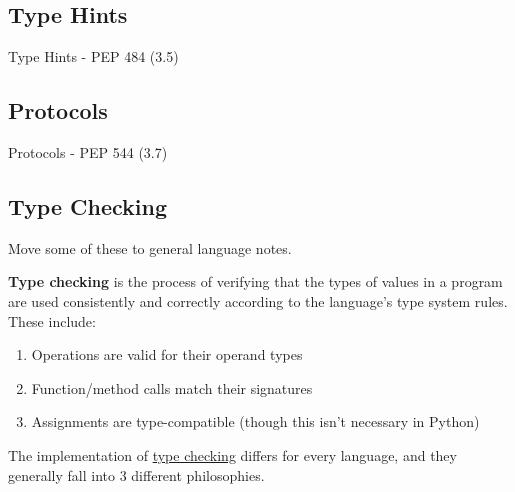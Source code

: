\subsection{Type Hints}

  Type Hints - PEP 484 (3.5) 

\subsection{Protocols}

  Protocols - PEP 544 (3.7) 

\subsection{Type Checking}

  \begin{question}[To Do]
    Move some of these to general language notes. 
  \end{question}

  \begin{definition}
    \label{def:type-checking}
    \textbf{Type checking} is the process of verifying that the types of values in a program are used consistently and correctly according to the language's type system rules. These include: 
    \begin{enumerate}
      \item Operations are valid for their operand types 
      \item Function/method calls match their signatures 
      \item Assignments are type-compatible (though this isn't necessary in Python) 
    \end{enumerate}
  \end{definition}

  The implementation of \hyperref[def:type-checking]{type checking} differs for every language, and they generally fall into 3 different philosophies. 

